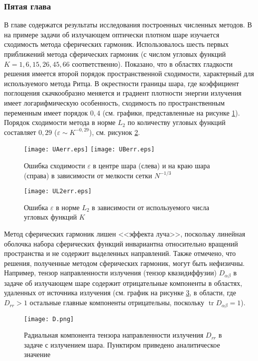 \subsubsection*{Пятая глава}
В главе содержатся результаты исследования построенных численных методов. В  на примере задачи об излучающем оптически плотном шаре изучается сходимость метода сферических гармоник. Использовалось шесть первых приближений метода сферических гармоник (с числом угловых функций $K = 1, 6, 15, 26, 45, 66$ соответственно).
Показано, что в областях гладкости решения имеется второй порядок пространственной сходимости, характерный для используемого метода Ритца. В окрестности границы шара, где коэффициент поглощения скачкообразно меняется и градиент плотности энергии излучения имеет логарифмическую особенность, сходимость по пространственным переменным имеет порядок $0,4$ (см. графики, представленные на рисунке \ref{fig:sphconv}). Порядок сходимости метода в норме $L_2$ по количеству угловых функций составляет $0,29$ ($\varepsilon \sim K^{-0,29}$), см. рисунок \ref{fig:angconv}.
\begin{figure}[ht!]
\centering
\texttt{[image: UAerr.eps]}
\texttt{[image: UBerr.eps]}
\caption{Ошибка сходимости $\varepsilon$ в центре шара (слева) и на краю шара (справа) в зависимости от мелкости сетки $N^{-1/3}$}
\label{fig:sphconv}
\end{figure}
\begin{figure}[ht!]
\centering
\texttt{[image: UL2err.eps]}
\caption{Ошибка $\varepsilon$ в норме $L_2$ в зависимости от используемого числа угловых функций $K$}
\label{fig:angconv}
\end{figure}

Метод сферических гармоник лишен <<эффекта луча>>, поскольку линейная оболочка набора сферических функций инвариантна относительно вращений пространства и не содержит выделенных направлений.
Также отмечено, что решения, полученные методом сферических гармоник, могут быть нефизичны. Например, тензор направленности излучения (тензор квазидиффузии) $D_{\alpha \beta}$ в задаче об излучающем шаре содержит отрицательные компоненты в областях, удаленных от источника излучения (см. график на рисунке \ref{fig:Drr}, в области, где $D_{rr} > 1$ остальные главные компоненты отрицательны, поскольку $\operatorname{tr} D_{\alpha\beta} = 1$). 
\begin{figure}[ht!]
\centering
\texttt{[image: D.png]}
\caption{Радиальная компонента тензора направленности излучения $D_{rr}$ в задаче с излучением шара. Пунктиром приведено аналитическое значение}
\label{fig:Drr}
\end{figure}


